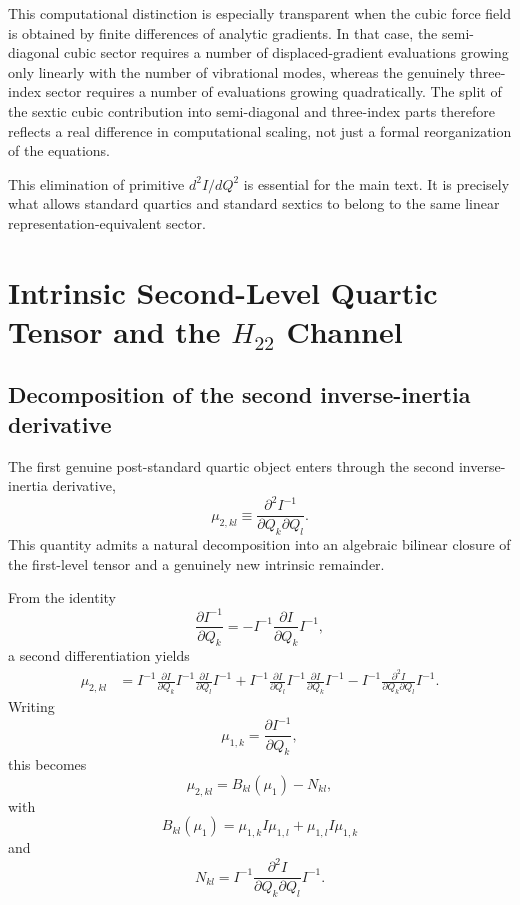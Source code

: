 \documentclass[journal=jacsat,manuscript=article]{achemso}
\begin{document}
This computational distinction is especially transparent when the cubic force
field is obtained by finite differences of analytic gradients. In that case,
the semi-diagonal cubic sector requires a number of displaced-gradient
evaluations growing only linearly with the number of vibrational modes,
whereas the genuinely three-index sector requires a number of evaluations
growing quadratically. The split of the sextic cubic contribution into
semi-diagonal and three-index parts therefore reflects a real difference in
computational scaling, not just a formal reorganization of the equations.\cite{cubic-vib_2024,fast_dvib_2025}

This elimination of primitive $d^2I/dQ^2$ is essential for the main text. It
is precisely what allows standard quartics and standard sextics to belong to
the same linear representation-equivalent sector.

\section{Intrinsic Second-Level Quartic Tensor and the \texorpdfstring{$H_{22}$}{H22} Channel}

\subsection{Decomposition of the second inverse-inertia derivative}

The first genuine post-standard quartic object enters through the second
inverse-inertia derivative,
\begin{equation}
\mu_{2,kl} \equiv \frac{\partial^2 I^{-1}}{\partial Q_k \partial Q_l}.
\end{equation}
This quantity admits a natural decomposition into an algebraic bilinear closure
of the first-level tensor and a genuinely new intrinsic remainder.

From the identity
\begin{equation}
\frac{\partial I^{-1}}{\partial Q_k}
=
-I^{-1}\frac{\partial I}{\partial Q_k}I^{-1},
\end{equation}
a second differentiation yields
\begin{align}
\mu_{2,kl}
&=
I^{-1}\frac{\partial I}{\partial Q_k}I^{-1}\frac{\partial I}{\partial Q_l}I^{-1}
+
I^{-1}\frac{\partial I}{\partial Q_l}I^{-1}\frac{\partial I}{\partial Q_k}I^{-1}
-
I^{-1}\frac{\partial^2 I}{\partial Q_k\partial Q_l}I^{-1}.
\end{align}
Writing
\begin{equation}
\mu_{1,k}=\frac{\partial I^{-1}}{\partial Q_k},
\end{equation}
this becomes
\begin{equation}
\mu_{2,kl} = B_{kl}(\mu_1) - N_{kl},
\label{eq:app_mu2_split}
\end{equation}
with
\begin{equation}
B_{kl}(\mu_1)=\mu_{1,k}I\mu_{1,l}+\mu_{1,l}I\mu_{1,k}
\end{equation}
and
\begin{equation}
N_{kl}=I^{-1}\frac{\partial^2 I}{\partial Q_k\partial Q_l}I^{-1}.
\end{equation}
\end{document}
